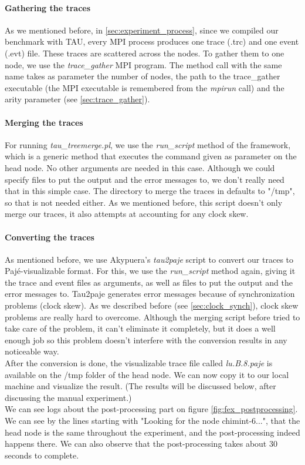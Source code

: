\paragraph{Gathering the traces}
As we mentioned before, in \ref{sec:experiment_process}, since we
compiled our benchmark with TAU, every MPI process produces
one trace (.trc) and one event (.evt) file. These traces are scattered
across the nodes. To gather them to one node, we use
the \emph{trace\_gather} MPI program. The method call with the same
name takes as parameter the number of nodes, the path to
the trace\_gather executable (the MPI executable is remembered
from the \emph{mpirun} call) and the arity parameter
(see \ref{sec:trace_gather}).
\paragraph{Merging the traces}
For running \emph{tau\_treemerge.pl}, we use the \emph{run\_script}
method of the framework, which is a generic method that executes the
command given as parameter on the head node. No other arguments are
needed in this case. Although we could specify files to put the output
and the error messages to, we don't really need that in this simple
case. The directory to merge the traces in defaults to "/tmp", so that
is not needed either. As we mentioned before, this script doesn't only
merge our traces, it also attempts at accounting for any clock skew.
\paragraph{Converting the traces}
As mentioned before, we use Akypuera's\cite{s13} \emph{tau2paje}
script to convert our traces to Pajé-visualizable format. For this, we
use the \emph{run\_script} method again, giving it the trace and event
files as arguments, as well as files to put the output and the error
messages to. Tau2paje generates error messages because of
synchronization problems (clock skew). As we described before
(see \ref{sec:clock_synch}), clock skew problems are really hard to
overcome. Although the merging script before tried to take care of the
problem, it can't eliminate it completely, but it does a well enough
job so this problem doesn't interfere with the conversion results in
any noticeable way.\\[0.3cm]
After the conversion is done, the visualizable trace file called
\emph{lu.B.8.paje} is available on the /tmp folder of the head
node. We can now copy it to our local machine and visualize the
result. (The results will be discussed below, after discussing the
manual experiment.)\\[0.3cm]
We can see logs about the post-processing part on
figure \ref{fig:fex_postprocessing}. We can see by the lines starting
with "Looking for the node chimint-6...", that the head node is the
same throughout the experiment, and the post-processing indeed happens
there. We can also observe that the post-processing takes about 30
seconds to complete.

